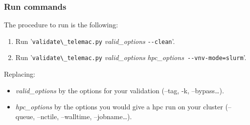 \subsubsection{Run commands}

The procedure to run is the following:
\begin{enumerate}
  \item Run '\verb!validate\_telemac.py! \textit{valid\_options} \verb!--clean!'.
  \item Run '\verb!validate\_telemac.py! \textit{valid\_options} \textit{hpc\_options}\verb! --vnv-mode=slurm!'.
\end{enumerate}

Replacing:
\begin{itemize}
  \item \textit{valid\_options} by the options for your validation (--tag, -k,
    --bypass\ldots).
  \item \textit{hpc\_options} by the options you would give a hpc \telma{} run on
    your cluster (--queue, --nctile, --walltime, --jobname\ldots).
\end{itemize}
